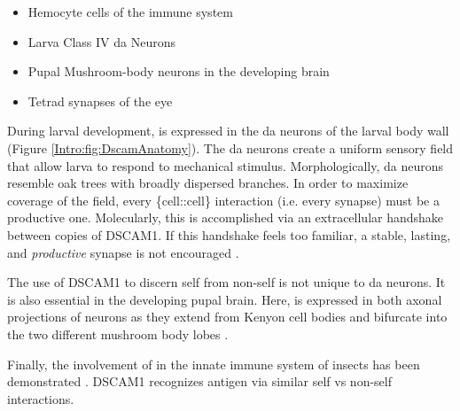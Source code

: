     \begin{itemize} \itemsep0.5pt \parskip0pt  %
      \singlespacing
      \item Hemocyte cells of the immune system
      \item Larva Class IV da Neurons
      \item Pupal Mushroom-body neurons in the developing brain
      \item Tetrad synapses of the eye
      \end{itemize}

    During larval development, \dscam{} is expressed in the da neurons of the larval body wall (Figure \ref{Intro:fig:DscamAnatomy}). The da neurons create a uniform sensory field that allow larva to respond to mechanical stimulus. Morphologically, da neurons resemble oak trees with broadly dispersed branches. In order to maximize coverage of the field, every \{cell::cell\} interaction (i.e. every synapse) must be a productive one. Molecularly, this is accomplished via an extracellular handshake between copies of DSCAM1. If this handshake feels too familiar, a stable, lasting, and \textit{productive} synapse is not encouraged \citep{Wojtowicz2004}.

    The use of DSCAM1 to discern self from non-self is not unique to da neurons. It is also essential in the developing pupal brain. Here, \dscam{} is expressed in both axonal projections of neurons as they extend from Kenyon cell bodies and bifurcate into the two different mushroom body lobes \citep{Zhan2004}.

    Finally, the involvement of \dscam{} in the innate immune system of insects has been demonstrated \citep{Watson2005,Dong2006}. DSCAM1 recognizes antigen via similar self vs non-self interactions.

